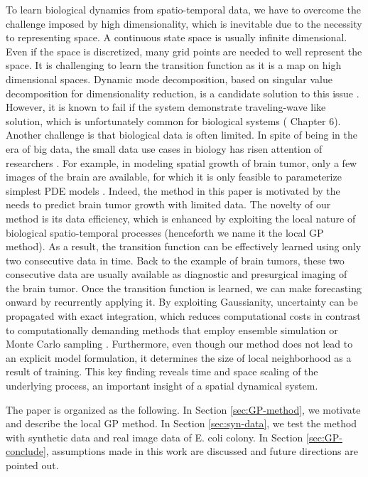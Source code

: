 \documentclass[11pt, reqno]{amsart}
\begin{document}
To learn biological dynamics from spatio-temporal data, we have to overcome the challenge imposed by high dimensionality, which is inevitable due to the necessity to representing space. A continuous state space is usually infinite dimensional. Even if the space is discretized, many grid points are needed to well represent the space. It is challenging to learn the transition function as it is a map on high dimensional spaces. Dynamic mode decomposition, based on singular value decomposition for dimensionality reduction, is a candidate solution to this issue \citep{schmid2010dynamic}. However, it is known to fail if the system demonstrate traveling-wave like solution, which is unfortunately common for biological systems (\citep{Brunton2019} Chapter 6). Another challenge is that biological data is often limited. In spite of being in the era of big data, the small data use cases in biology has risen attention of researchers \citep{Lagergren2020}.  For example, in modeling spatial growth of brain tumor, only a few images of the brain are available, for which it is only feasible to parameterize simplest PDE models \citep{Han2019b,lipkova2019personalized,McDaniel2013}. Indeed, the method in this paper is motivated by the needs to predict brain tumor growth with limited data. The novelty of our method is its data efficiency, which is enhanced by exploiting the local nature of biological spatio-temporal processes (henceforth we name it the local GP method). As a result, the transition function can be effectively learned using only two consecutive data in time. Back to the example of brain tumors, these two consecutive data are usually available as diagnostic and presurgical imaging of the brain tumor. Once the transition function is learned, we can make forecasting onward by recurrently applying it. By exploiting Gaussianity, uncertainty can be propagated with exact integration, which reduces computational costs in contrast to computationally demanding methods that employ ensemble simulation or Monte Carlo sampling \citep{lipkova2019personalized,McDaniel2013}. Furthermore, even though our method does not lead to an explicit model formulation, it determines the size of local neighborhood as a result of training. This key finding reveals time and space scaling of the underlying process, an important insight of a spatial dynamical system.  
               
The paper is organized as the following. In Section \ref{sec:GP-method}, we motivate and describe the local GP method. In Section \ref{sec:syn-data}, we test the method with synthetic data and real image data of E. coli colony. In Section \ref{sec:GP-conclude}, assumptions made in this work are discussed and future directions are pointed out.
\end{document}
